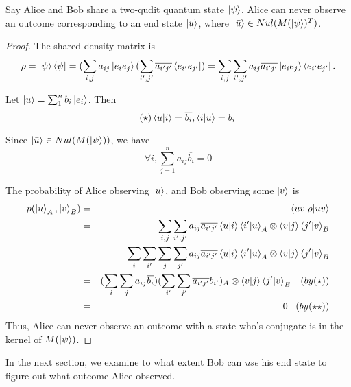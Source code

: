\begin{prop} \label{null space}
Say Alice and Bob share a two-qudit quantum state $\ket{\psi}$. Alice can never observe an outcome corresponding to an end state $\ket{u}$, where $\ket{\Bar{u}} \in Nul(M(\ket{\psi})^T)$.
\end{prop}
\begin{proof}
The shared density matrix is 
\begin{gather*}
\rho=\ket{\psi}\bra{\psi}=(\sum_{i,j} a_{ij}\ket{e_i e_j}(\sum_{i',j'} \overline{a_{i'j'}}\bra{e_{i'} e_{j'}})=\sum_{i,j} \sum_{i',j'} a_{ij} \overline{a_{i'j'}}\ket{e_i e_j}\bra{e_{i'} e_{j'}}.  
\end{gather*}

Let $\ket{u}=\sum_1^n b_i \ket{e_i}$. Then
\begin{equation*} \tag{$\star$}
    \braket{u|i}=\overline{b_i}, \braket{i|u}=b_i
\end{equation*}

Since $\ket{\Bar{u}} \in Nul(M(\ket{\psi}))$, we have 
\begin{equation*} \tag{$\star \star$}
    \forall i, \sum_{j=1}^n a_{ij} \overline{b_i}=0
\end{equation*}

The probability of Alice observing $\ket{u}$, and Bob observing some $\ket{v}$ is
\begin{eqnarray*}
p(\ket{u}_A, \ket{v}_B)&=&\braket{u v | \rho |u v}\\
&=&\sum_{i,j} \sum_{i',j'} a_{ij} \overline{a_{i'j'}}\braket{u|i}\braket{i'|u}_A \otimes \braket{v|j}\braket{j'|v}_B\\
&=&\sum_i \sum_{i'} \sum_j \sum_{j'}  a_{ij} \overline{a_{i'j'}} \braket{u|i}\braket{i'|u}_A \otimes \braket{v|j}\braket{j'|v}_B\\
&=&(\sum_i \sum_j a_{ij} \overline{b_i})(\sum_{i'} \sum_{j'} \overline{a_{i'j'}} b_{i'})_A \otimes \braket{v|j}\braket{j'|v}_B   \; \; \;  (by (\star))\\ 
&=& 0 \; \; \; (by (\star \star))
\end{eqnarray*}
Thus, Alice can never observe an outcome with a state who's conjugate is in the kernel of $M(\ket{\psi})$.
\end{proof}

In the next section, we examine to what extent Bob can {\emph{use}} his end state to figure out what outcome Alice observed.


\pagebreak

